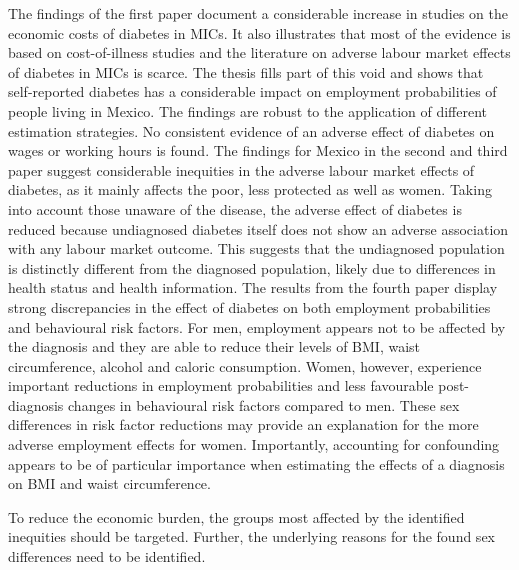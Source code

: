 The findings of the first paper document a considerable increase in studies on the economic costs of diabetes in \acp{MIC}. It also illustrates that most of the evidence is based on cost-of-illness studies and the literature on adverse labour market effects of diabetes in \acp{MIC} is scarce. The thesis fills part of this void and shows that self-reported diabetes has a considerable impact on employment probabilities of people living in Mexico. The findings are robust to the application of different estimation strategies. No consistent evidence of an adverse effect of diabetes on wages or working hours is found. The findings for Mexico in the second and third paper suggest considerable inequities in the adverse labour market effects of diabetes, as it mainly affects the poor, less protected as well as women. Taking into account those unaware of the disease, the adverse effect of diabetes is reduced because undiagnosed diabetes itself does not show an adverse association with any labour market outcome. This suggests that the undiagnosed population is distinctly different from the diagnosed population, likely due to differences in health status and health information. The results from the fourth paper display strong discrepancies in the effect of diabetes on both employment probabilities and behavioural risk factors. For men, employment appears not to be affected by the diagnosis and they are able to reduce their levels of \ac{BMI}, waist circumference, alcohol and caloric consumption. Women, however, experience important reductions in employment probabilities and less favourable post-diagnosis changes in behavioural risk factors compared to men. These sex differences in risk factor reductions may provide an explanation for the more adverse employment effects for women. Importantly, accounting for confounding appears to be of particular importance when estimating the effects of a diagnosis on \ac{BMI} and waist circumference.

To reduce the economic burden, the groups most affected by the identified inequities should be targeted. Further, the underlying reasons for the found sex differences need to be identified.

